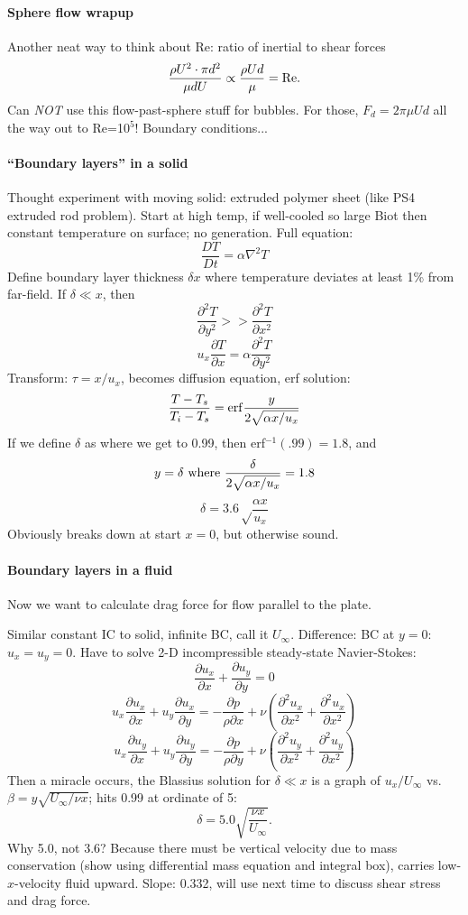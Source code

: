 \documentclass{report}
\begin{document}
\paragraph{Sphere flow wrapup}

Another neat way to think about Re: ratio of inertial to shear forces
$$\frac{\rho U^2\cdot\pi d^2}{\mu dU}\propto \frac{\rho Ud}{\mu}= {\rm Re}.$$
Can {\em NOT} use this flow-past-sphere stuff for bubbles.  For those,
$F_d=2\pi\mu Ud$ all the way out to Re=10$^5$!  Boundary conditions...

\paragraph{``Boundary layers'' in a solid}

Thought experiment with moving solid: extruded polymer sheet (like PS4
extruded rod problem).  Start at high temp, if well-cooled so large Biot then
constant temperature on surface; no generation.  Full equation:
$$\frac{DT}{Dt} = \alpha\nabla^2T$$
Define boundary layer thickness $\delta{x}$ where temperature deviates at least
1\% from far-field.  If $\delta\ll x$, then
$$\frac{\partial^2T}{\partial y^2}>>\frac{\partial^2 T}{\partial x^2}$$
$$u_x\frac{\partial T}{\partial x} = \alpha\frac{\partial^2T}{\partial y^2}$$
Transform: $\tau = x/u_x$, becomes diffusion equation, erf solution:
$$\frac{T-T_s}{T_i-T_s} = {\rm erf}\frac{y}{2\sqrt{\alpha x/u_x}}$$
If we define $\delta$ as where we get to 0.99, then erf$^{-1}(.99)=1.8$, and
$$y=\delta\ {\rm where}\ \frac{\delta}{2\sqrt{\alpha x/u_x}}=1.8$$
$$\delta = 3.6\sqrt\frac{\alpha x}{u_x}$$
Obviously breaks down at start $x=0$, but otherwise sound.

\paragraph{Boundary layers in a fluid}

Now we want to calculate drag force for flow parallel to the plate.

Similar constant IC to solid, infinite BC, call it $U_\infty$.  Difference: BC
at $y=0$: $u_x=u_y=0$.  Have to solve 2-D incompressible steady-state
Navier-Stokes:
$$\frac{\partial u_x}{\partial x}+\frac{\partial u_y}{\partial y} = 0$$
$$u_x\frac{\partial u_x}{\partial x} + u_y\frac{\partial u_x}{\partial y} =
-\frac{\partial p}{\rho\partial x} +
\nu\left(\frac{\partial^2 u_x}{\partial x^2} +
  \frac{\partial^2 u_x}{\partial x^2}\right)$$
$$u_x\frac{\partial u_y}{\partial x} + u_y\frac{\partial u_y}{\partial y} =
-\frac{\partial p}{\rho\partial y} +
\nu\left(\frac{\partial^2 u_y}{\partial x^2} +
  \frac{\partial^2 u_y}{\partial x^2}\right)$$
Then a miracle occurs, the Blassius solution for $\delta\ll x$ is a graph of
$u_x/U_\infty$ vs. $\beta=y\sqrt{U_\infty/\nu x}$; hits 0.99 at ordinate of 5:
$$\delta = 5.0\sqrt{\frac{\nu x}{U_\infty}}.$$
Why 5.0, not 3.6?  Because there must be vertical velocity due to mass
conservation (show using differential mass equation and integral box), carries
low-$x$-velocity fluid upward.  Slope: 0.332, will use next time to discuss
shear stress and drag force.
\newpage
\end{document}
